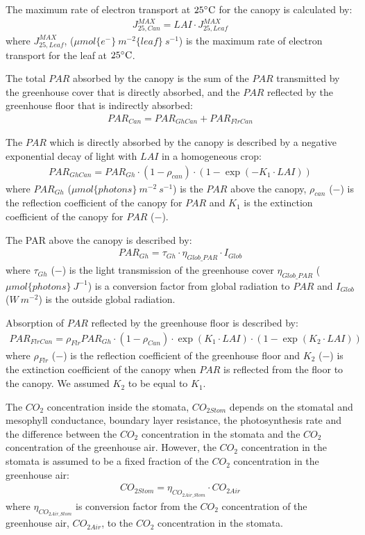 \documentclass[a4paper]{article}
\numberwithin{equation}{section}
\begin{document}
The maximum rate of electron transport at \(25 \celsius\) for the canopy is calculated by:
\begin{align}
  J^{MAX}_{25,Can} = LAI \cdot J^{MAX}_{25,Leaf}
\end{align}
where \(J^{MAX}_{25,Leaf}\), (\(\mu mol\{e^-\}\ m^{-2}\{leaf\}\ s^{-1}\)) is the maximum rate of electron transport for the leaf at \(25 \celsius\).

The total \(PAR\) absorbed by the canopy is the sum of the \(PAR\) transmitted by the greenhouse cover that is directly absorbed, and the \(PAR\) reflected by the greenhouse floor that is indirectly absorbed:
\begin{align}
  PAR_{Can} = PAR_{GhCan} + PAR_{FlrCan}
\end{align}

The \(PAR\) which is directly absorbed by the canopy is described by a negative exponential decay of light with \(LAI\) in a homogeneous crop:
\begin{align}
  PAR_{GhCan} = PAR_{Gh}\cdot (1-\rho_{can})\cdot(1 - \exp \left(-K_1\cdot LAI\right))
\end{align}
where \(PAR_{Gh}\) (\(\mu mol \{photons\}\ m^{-2}\ s^{-1}\)) is the \(PAR\) above the canopy, \(\rho_{can}\) (\(-\)) is the reflection coefficient of the canopy for \(PAR\) and \(K_1\) is the extinction coefficient of the canopy for \(PAR\) (\(-\)).

The PAR above the canopy is described by:
\begin{align}
  PAR_{Gh} = \tau_{Gh} \cdot \eta_{Glob\_PAR}\cdot I_{Glob}
\end{align}
where \(\tau_{Gh}\) (\(-\)) is the light transmission of the greenhouse cover \(\eta_{Glob\_PAR}\) (\(\mu mol\{photons\}\ J^{-1}\)) is a conversion factor from global radiation to \(PAR\) and \(I_{Glob}\) (\(W\ m^{-2}\)) is the outside global radiation.

Absorption of \(PAR\) reflected by the greenhouse floor is described by:
\begin{align}
  PAR_{FlrCan} = \rho_{Flr}PAR_{Gh}\cdot (1-\rho_{Can})\cdot \exp \left(K_1\cdot LAI\right) \cdot (1 - \exp \left(K_2\cdot LAI\right))
\end{align}
where \(\rho_{Flr}\) (\(-\)) is the reflection coefficient of the greenhouse floor and \(K_2\) (\(-\)) is the extinction coefficient of the canopy when \(PAR\) is reflected from the floor to the canopy. We assumed \(K_2\) to be equal to \(K_1\).

The \(CO_2\) concentration inside the stomata, \(CO_{2Stom}\) depends on the stomatal and mesophyll conductance, boundary layer resistance, the photosynthesis rate and the difference between the \(CO_2\) concentration in the stomata and the \(CO_2\) concentration of the greenhouse air. However, the \(CO_2\) concentration in the stomata is assumed to be a fixed fraction of the \(CO_2\) concentration in the greenhouse air:
\begin{align}
  CO_{2Stom} = \eta_{CO_{2Air\_Stom}} \cdot CO_{2Air}
\end{align}
where \(\eta_{CO_{2Air\_Stom}}\) is conversion factor from the \(CO_2\) concentration of the greenhouse air, \(CO_{2Air}\), to the \(CO_2\) concentration in the stomata.
\end{document}
